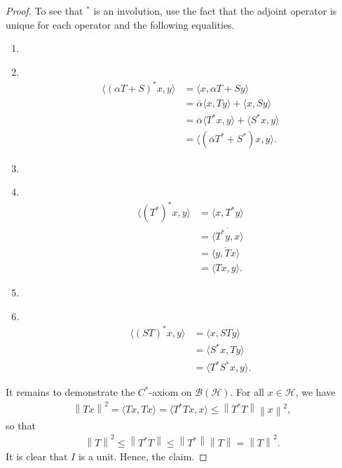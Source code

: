 \documentclass[11pt,a4paper]{report}
\theoremstyle{plain}
\theoremstyle{definition}
\newcommand{\1}{\mathbbm{1}}
\renewcommand{\H}{\mathcal{H}}
\newcommand{\B}{\mathcal{B}}
\newcommand{\BH}{\mathcal{\B(\H)}}
\newcommand\Item[1][]{ 						%
  \ifx\relax#1\relax  \item \else \item[#1] \fi
  \abovedisplayskip=0pt\abovedisplayshortskip=0pt~\vspace*{-\baselineskip}}
\begin{document}
\begin{proof}
	To see that $^\ast$ is an involution, use the fact that the adjoint 
	operator is unique for each operator and the following equalities.
	\begin{enumerate}
	\Item	\begin{align*}
				\langle (\alpha T+S)^\ast x,y\rangle 
			&=	\langle x, \alpha T+S y \rangle									\\
			&=	\overline{\alpha}\langle x,Ty\rangle + \langle x, Sy \rangle	\\
			&=	\overline{\alpha}\langle T^\ast x,y\rangle +
										 \langle S^\ast x, y \rangle			\\
			&=	\langle(\overline{\alpha} T^\ast + S^\ast) x, y \rangle.
			\end{align*}
	\Item 	\begin{align*}
				\langle (T^\ast)^\ast x,y\rangle 
			&=	\langle x, T^\ast y \rangle										\\
			&=	\overline{\langle T^\ast y,x \rangle}							\\
			&=	\overline{\langle y, Tx \rangle}								\\
			&=	\langle Tx,y\rangle.
			\end{align*}
	\Item	\begin{align*}
				\langle (ST)^\ast x,y \rangle
			&=	\langle x, STy \rangle											\\
			&=	\langle	S^\ast x,Ty \rangle										\\
			&=	\langle T^\ast S^\ast x,y \rangle.
		\end{align*}
	\end{enumerate}
	It remains to demonstrate the $C^\ast$-axiom on $\BH$. For all $x\in\H$, we have
	\begin{align*}
		\left\|Tx\right\|^2 = \langle Tx,Tx\rangle 
					=  \langle T^\ast Tx,x\rangle \leq \left\|T^\ast T\right\| \left\|x\right\|^2,
	\end{align*}
	so that
	\begin{align*}
		\left\|T\right\|^2 \leq \left\|T^\ast T\right\| 
					\leq \left\|T^\ast\right\| \left\|T\right\| = \left\|T\right\|^2.
	\end{align*}
	It is clear that $I$ is a unit.
	Hence, the claim.
\end{proof} 
\end{document}
